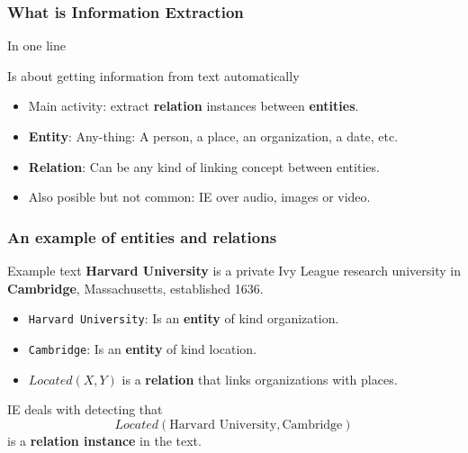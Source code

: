 \documentclass{beamer}
\begin{document}
\begin{frame}
\frametitle{What is Information Extraction}

\vfill

\begin{block}{\centerline{In one line}}
    \centerline{Is about getting information from text automatically}
\end{block}

\vfill

\begin{itemize}
    \item Main activity: extract {\bf relation} instances between {\bf entities}.
    \item {\bf Entity}: Any-thing: A person, a place, an organization, a date, etc.
    \item {\bf Relation}: Can be any kind of linking concept between entities.
    \item Also posible but not common: IE over audio, images or video.
\end{itemize}

\end{frame}



\begin{frame}
\frametitle{An example of entities and relations}

\begin{block}{Example text}
    {\bf Harvard University} is a private Ivy League research university in
    {\bf Cambridge}, Massachusetts, established 1636.
\end{block}

\begin{itemize}
    \item {\tt Harvard University}: Is an {\bf entity} of kind organization.
    \item {\tt Cambridge}: Is an {\bf entity} of kind location.
    \item $Located(X, Y)$ is a {\bf relation} that links organizations with places.
\end{itemize}

\pause

\begin{block}{ }
IE deals with detecting that
\[Located(\text{Harvard University}, \text{Cambridge})\]
is a {\bf relation instance} in the text.
\end{block}


\end{frame}
\end{document}
